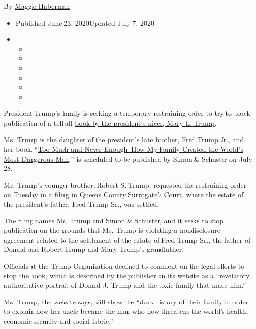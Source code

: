 By \href{https://www.nytimes.com/by/maggie-haberman}{Maggie Haberman}

\begin{itemize}
\item
  Published June 23, 2020Updated July 7, 2020
\item
  \begin{itemize}
  \item
  \item
  \item
  \item
  \item
  \item
  \end{itemize}
\end{itemize}

President Trump's family is seeking a temporary restraining order to try
to block publication of a tell-all
\href{https://www.nytimes.com/2020/07/07/us/politics/mary-trump-book.html}{book
by the president's niece, Mary L. Trump}.

Ms. Trump is the daughter of the president's late brother, Fred Trump
Jr., and her book,
``\href{https://www.nytimes.com/2020/07/01/us/politics/mary-trump-book-lawsuit.html}{Too
Much and Never Enough: How My Family Created the World's Most Dangerous
Man},'' is scheduled to be published by Simon \& Schuster on July 28.

Mr. Trump's younger brother, Robert S. Trump, requested the restraining
order on Tuesday in a filing in Queens County Surrogate's Court, where
the estate of the president's father, Fred Trump Sr., was settled.

The filing names
\href{https://www.nytimes.com/2020/07/08/books/review/mary-trump-book-takeaways.html}{Ms.
Trump} and Simon \& Schuster, and it seeks to stop publication on the
grounds that Ms. Trump is violating a nondisclosure agreement related to
the settlement of the estate of Fred Trump Sr., the father of Donald and
Robert Trump and Mary Trump's grandfather.

Officials at the Trump Organization declined to comment on the legal
efforts to stop the book, which is described by the publisher
\href{https://www.simonandschuster.com/books/Too-Much-and-Never-Enough/Mary-L-Trump/9781982141462}{on
its website} as a ``revelatory, authoritative portrait of Donald J.
Trump and the toxic family that made him.''

Ms. Trump, the website says, will show the ``dark history of their
family in order to explain how her uncle became the man who now
threatens the world's health, economic security and social fabric.''

